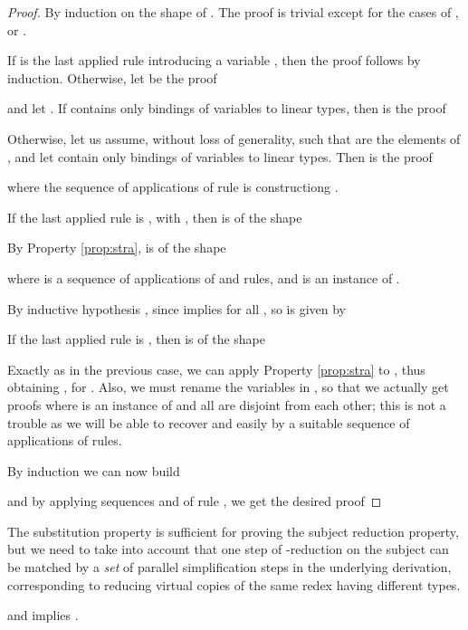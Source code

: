 \begin{proof} By induction on the shape of . The proof is trivial except for the cases of ,  or .

If  is the last applied rule introducing a variable , then the proof follows by induction. Otherwise, let  be the proof
\small

\normalsize
and let . 
If  contains only bindings of variables to linear types, then  is the proof
\small

\normalsize
Otherwise, let us assume, without loss of generality,  such that  are the elements of , and let  contain only bindings of variables to linear types. Then  is the proof
\small

\normalsize
where the sequence of applications of rule  is constructiong .

If the last applied rule is , with , then  is of the shape 
\small
 
\normalsize
By Property \ref{prop:stra},  is of the shape
\small

\normalsize
where  is a sequence of applications of  and  rules, and  is an instance of .

By inductive hypothesis , since  implies  for all  ,
so  is given by
\small

\normalsize
If the last applied rule is , then  is of the shape 
\small

\normalsize
Exactly as in the previous case, we can apply Property \ref{prop:stra} to , thus obtaining , for .
Also, we must rename the variables in , so that 
we actually get proofs  where  is an instance of  and all  are disjoint from each other; this is not a trouble as we will be able to recover  and  easily by a suitable sequence  of applications of  rules.

By induction we can now build






and by applying sequences  and  of rule , we get the desired proof
\small

\normalsize
\end{proof}

The substitution property is sufficient for proving the subject reduction property, but we need to take into account that one step of -reduction on the subject can be matched by a \textsl{set} of  parallel simplification steps in the underlying derivation, corresponding to reducing virtual copies of the same redex having different types.


\begin{property}
\label{prop:subjred}
 and  implies .
\end{property}

